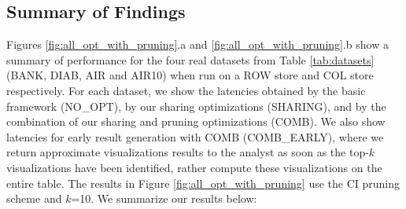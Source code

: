 

\subsection{Summary of Findings}
\label{sec:expt_summary}

Figures \ref{fig:all_opt_with_pruning}.a and \ref{fig:all_opt_with_pruning}.b show a summary of \SeeDB performance for the four real datasets from Table \ref{tab:datasets} (BANK, DIAB, AIR and AIR10) when run on a ROW store and COL store respectively.
For each dataset, we show the latencies obtained by the basic \SeeDB framework (NO\_OPT), by our sharing optimizations (SHARING), and by the combination of our sharing and pruning optimizations (COMB). 
We also show latencies for early result generation with COMB (COMB\_EARLY), where we return approximate visualizations results to the analyst as soon as the top-$k$ visualizations have been identified, rather compute these visualizations on the entire table.
The results in Figure \ref{fig:all_opt_with_pruning} 
use the CI pruning scheme and $k$=10. We summarize our results below:



